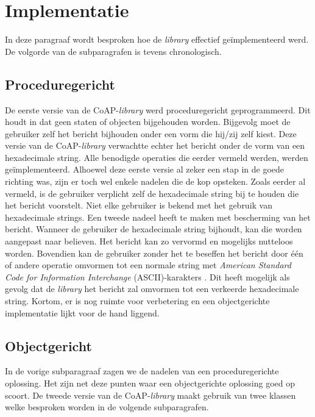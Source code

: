 \section{Implementatie}

In deze paragraaf wordt besproken hoe de \textit{library} effectief ge\"{i}mplementeerd werd. De volgorde van de subparagrafen is tevens chronologisch. 

\subsection{Proceduregericht}

De eerste versie van de CoAP-\textit{library} werd proceduregericht geprogrammeerd. Dit houdt in dat geen staten of objecten bijgehouden worden. Bijgevolg moet de gebruiker zelf het bericht bijhouden onder een vorm die hij/zij zelf kiest. Deze versie van de CoAP-\textit{library} verwachtte echter het bericht onder de vorm van een hexadecimale string. Alle benodigde operaties die eerder vermeld werden, werden ge\"{i}mplementeerd. Alhoewel deze eerste versie al zeker een stap in de goede richting was, zijn er toch wel enkele nadelen die de kop opsteken. Zoals eerder al vermeld, is de gebruiker verplicht zelf de hexadecimale string bij te houden die het bericht voorstelt. Niet elke gebruiker is bekend met het gebruik van hexadecimale strings. Een tweede nadeel heeft te maken met bescherming van het bericht. Wanneer de gebruiker de hexadecimale string bijhoudt, kan die worden aangepast naar believen. Het bericht kan zo vervormd en mogelijks nutteloos worden. Bovendien kan de gebruiker zonder het te beseffen het bericht door \'{e}\'{e}n of andere operatie omvormen tot een normale string met \textit{American Standard Code for Information Interchange} (ASCII)-karakters . Dit heeft mogelijk als gevolg dat de \textit{library} het bericht zal omvormen tot een verkeerde hexadecimale string. Kortom, er is nog ruimte voor verbetering en een objectgerichte implementatie lijkt voor de hand liggend.

\subsection{Objectgericht}

In de vorige subparagraaf zagen we de nadelen van een proceduregerichte oplossing. Het zijn net deze punten waar een objectgerichte oplossing goed op scoort. De tweede versie van de CoAP-\textit{library} maakt gebruik van twee klassen welke besproken worden in de volgende subparagrafen.

